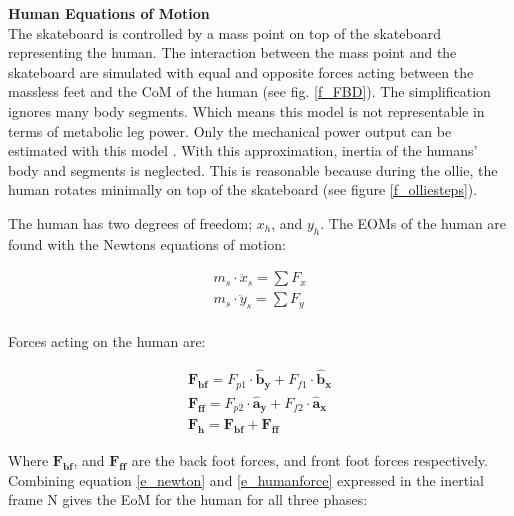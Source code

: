 \documentclass[default,iicol]{sn-jnl}
\begin{document}
\textbf{Human Equations of Motion} \\
\noindent The skateboard is controlled by a mass point on top of the skateboard representing the human. The interaction between the mass point and the skateboard are simulated with equal and opposite forces acting between the massless feet and the CoM of the human (see fig. \ref{f_FBD}). The simplification ignores many body segments. Which means this model is not representable in terms of metabolic leg power. Only the mechanical power output can be estimated with this model \cite{van_der_kruk_power_2018,morin_biomechanics_2018}. With this approximation, inertia of the humans' body and segments is neglected. This is reasonable because during the ollie, the human rotates minimally on top of the skateboard (see figure \ref{f_olliesteps}). 

The human has two degrees of freedom; $x_h$, and $y_h$. The EOMs of the human are found with the Newtons equations of motion:

\begin{equation}\label{e_newton}
\begin{array}{c}
        m_s \cdot \ddot x_s = \sum F_x  \\
        m_s \cdot \ddot y_s = \sum F_y  \\
    \end{array}
\end{equation}

\noindent Forces acting on the human are:

\begin{equation} \label{e_humanforce}
\begin{array}{cc}
      \mathbf{F_{bf}} = F_{p1} \cdot \mathbf{\hat b_y} + F_{f1} \cdot \mathbf{\hat b_x}\\
      \mathbf{F_{ff}} = F_{p2} \cdot \mathbf{\hat a_y} + F_{f2} \cdot \mathbf{\hat a_x}\\
      \mathbf{F_h}    = \mathbf{F_{bf}} + \mathbf{F_{ff}}
\end{array}
\end{equation}

\noindent Where $\mathbf{F_{bf}}$, and  $\mathbf{F_{ff}}$ are the back foot forces, and front foot forces respectively. Combining equation \ref{e_newton} and \ref{e_humanforce} expressed in the inertial frame N gives the EoM for the human for all three phases:
\end{document}
